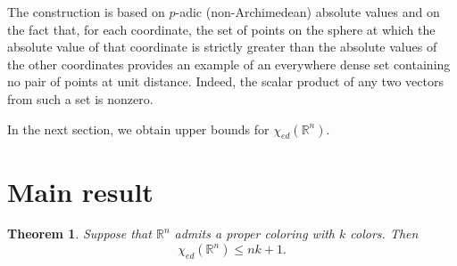\documentclass[12pt,a4paper]{article}
\newtheorem{theorem}{Theorem}
\begin{document}
The construction is based on $p$-adic (non-Archimedean) absolute values
and on the fact that, for each coordinate, the set of points on the sphere
at which the absolute value of that coordinate is strictly greater than
the absolute values of the other coordinates provides an example of an
everywhere dense set containing no pair of points at unit distance. Indeed,
the scalar product of any two vectors from such a set is nonzero.

In the next section, we obtain upper bounds for
$\chi_{ed}(\mathbb{R}^n)$.


\section{Main result}

\begin{theorem}
Suppose that $\mathbb{R}^n$ admits a proper coloring with $k$ colors.
Then
\[
    \chi_{ed}(\mathbb{R}^n)\leq nk+1.
\]
\label{thm:main}
\end{theorem}
\end{document}
